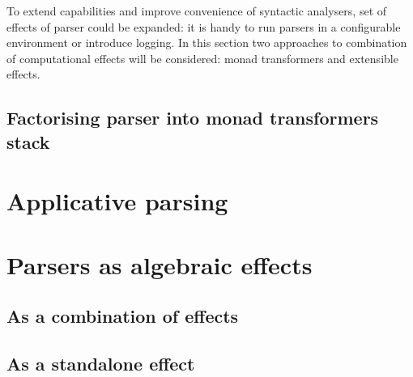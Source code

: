       To extend capabilities and improve convenience of syntactic analysers, set of
      effects of parser could be expanded: it is handy to run parsers in a configurable
      environment or introduce logging. In this section two approaches to combination
      of computational effects will be considered: monad transformers and extensible
      effects.

    \subsection{Factorising parser into monad transformers stack}

  \section{Applicative parsing}
  \label{cpt-parsers:applicative}

  \section{Parsers as algebraic effects}
  \label{cpt-parsers:alg-eff}

    \subsection{As a combination of effects}

    \subsection{As a standalone effect}
